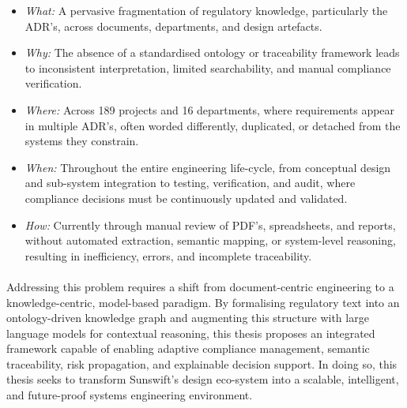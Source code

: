         \begin{itemize}
            \item \textit{What:} A pervasive fragmentation of regulatory knowledge, particularly the ADR's, across documents, departments, and design artefacts.
            \item \textit{Why:} The absence of a standardised ontology or traceability framework leads to inconsistent interpretation, limited searchability, and manual compliance verification.
            \item \textit{Where:} Across 189 projects and 16 departments, where requirements appear in multiple ADR's, often worded differently, duplicated, or detached from the systems they constrain.
            \item \textit{When:} Throughout the entire engineering life-cycle, from conceptual design and sub-system integration to testing, verification, and audit, where compliance decisions must be continuously updated and validated.
            \item \textit{How:} Currently through manual review of PDF's, spreadsheets, and reports, without automated extraction, semantic mapping, or system-level reasoning, resulting in inefficiency, errors, and incomplete traceability.
        \end{itemize}

        \paragraph{} Addressing this problem requires a shift from document-centric engineering to a knowledge-centric, model-based paradigm. By formalising regulatory text into an ontology-driven knowledge graph and augmenting this structure with large language models for contextual reasoning, this thesis proposes an integrated framework capable of enabling adaptive compliance management, semantic traceability, risk propagation, and explainable decision support. In doing so, this thesis seeks to transform Sunswift’s design eco-system into a scalable, intelligent, and future-proof systems engineering environment.
